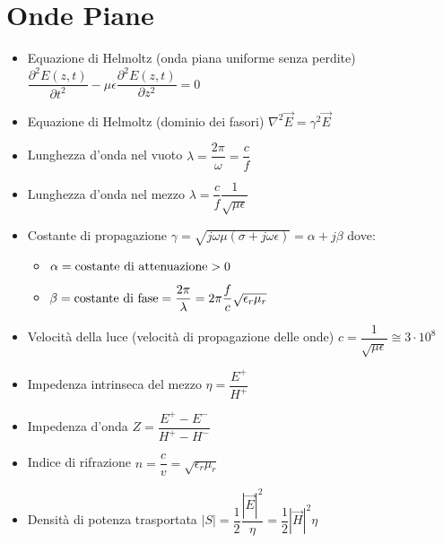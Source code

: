\documentclass{article}
\begin{document}
\section{Onde Piane}
\begin{itemize}
	\item Equazione di Helmoltz (onda piana uniforme senza perdite) \( \dfrac{\partial^2 E(z, t)}{\partial t^2} - \mu \epsilon \dfrac{\partial^2 E(z, t)}{\partial z^2} = 0\)
	\item Equazione di Helmoltz (dominio dei fasori) \( \nabla^2 \vec{E} = \gamma^2 \vec{E} \)
	\item Lunghezza d'onda nel vuoto \( \lambda = \dfrac{2 \pi}{\omega} = \dfrac{c}{f} \)	
	\item Lunghezza d'onda nel mezzo \( \lambda = \dfrac{c}{f} \dfrac{1}{\sqrt{\mu \epsilon}} \)
	\item Costante di propagazione \( \gamma = \sqrt{j\omega\mu (\sigma + j \omega \epsilon) } = \alpha + j \beta \) dove:
	\begin{itemize}
		\item \( \alpha = \textnormal{costante di attenuazione} > 0\)
		\item \( \beta = \textnormal{costante di fase} = \dfrac{2 \pi}{\lambda} = 2 \pi \dfrac{f}{c} \sqrt{\epsilon_r \mu_r}\)
	\end{itemize}
	\item Velocità della luce (velocità di propagazione delle onde) \( c = \dfrac{1}{\sqrt{\mu \epsilon}} \cong 3 \cdot 10^8 \)
	\item Impedenza intrinseca del mezzo \( \eta = \dfrac{E^+}{H^+} \)
	\item Impedenza d'onda \( Z = \dfrac{E^+ - E^-}{H^+ - H^-} \)
	\item Indice di rifrazione \( n = \dfrac{c}{v} = \sqrt{\epsilon_r \mu_r} \)
	\item Densità di potenza trasportata \( |S| = \dfrac{1}{2} \dfrac{|\vec{E}|^2}{\eta} = \dfrac{1}{2} |\vec{H}|^2 \eta \)
\end{itemize}
\end{document}
